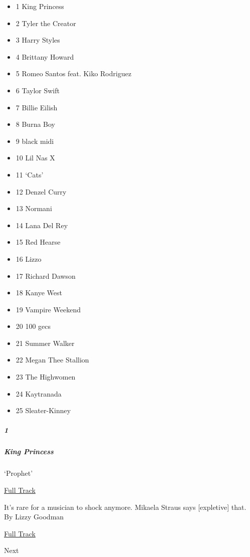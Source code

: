 \begin{itemize}
\tightlist
\item
  1 King Princess
\item
  2 Tyler the Creator
\item
  3 Harry Styles
\item
  4 Brittany Howard
\item
  5 Romeo Santos feat. Kiko Rodriguez
\item
  6 Taylor Swift
\item
  7 Billie Eilish
\item
  8 Burna Boy
\item
  9 black midi
\item
  10 Lil Nas X
\item
  11 `Cats'
\item
  12 Denzel Curry
\item
  13 Normani
\item
  14 Lana Del Rey
\item
  15 Red Hearse
\item
  16 Lizzo
\item
  17 Richard Dawson
\item
  18 Kanye West
\item
  19 Vampire Weekend
\item
  20 100 gecs
\item
  21 Summer Walker
\item
  22 Megan Thee Stallion
\item
  23 The Highwomen
\item
  24 Kaytranada
\item
  25 Sleater-Kinney
\end{itemize}

\hypertarget{1}{%
\subparagraph{1}\label{1}}

\hypertarget{king-princess}{%
\subparagraph{King Princess}\label{king-princess}}

`Prophet'

\href{https://open.spotify.com/track/4eA4z7FCy5Fp6mh8acV3GY?si=3CrPDAWMROObx6wcpKjOmw}{
Full Track}

It's rare for a musician to shock anymore. Mikaela Straus says
{[}expletive{]} that. By Lizzy Goodman

\href{https://open.spotify.com/track/4eA4z7FCy5Fp6mh8acV3GY?si=3CrPDAWMROObx6wcpKjOmw}{Full
Track }

Next

